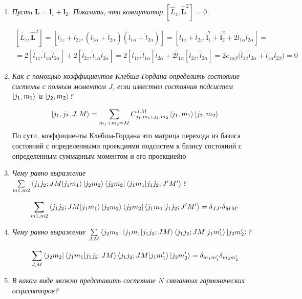 \documentclass{article}
\begin{document}
\begin{enumerate}
	\item \textit{Пусть $\textbf{L} = \textbf{l}_1 + \textbf{l}_2$. Показать, что коммутатор $[\hat{L}_z,\hat{\textbf{L}}^2] = 0$.}
	
	\begin{equation}
	\begin{split}
		[\hat{L}_z,\hat{\textbf{L}}^2] = [\hat{l}_{1z} + \hat{l}_{2z}, (\hat{l}_{1\alpha} + \hat{l}_{2\alpha})(\hat{l}_{1\alpha} + \hat{l}_{2\alpha})] = [\hat{l}_{1z} + \hat{l}_{2z}, \hat{\textbf{l}}_{1}^2 + \hat{\textbf{l}}_{2}^2 + 2\hat{l}_{1\alpha}\hat{l}_{2\alpha}] = \\
		= 2[ \hat{l}_{1z}, \hat{l}_{1\alpha}\hat{l}_{2\alpha}] + 2[ \hat{l}_{2z}, \hat{l}_{1\alpha}\hat{l}_{2\alpha}] = 2[ \hat{l}_{1z}, \hat{l}_{1\alpha}]\hat{l}_{2\alpha} + 2\hat{l}_{1\alpha}[ \hat{l}_{2z}, \hat{l}_{2\alpha}] = 2 e_{z\alpha\beta} \big( \hat{l}_{1\beta} \hat{l}_{2\alpha} + \hat{l}_{1\alpha} \hat{l}_{2\beta}\big ) = 0
	\end{split}
	\end{equation}
	
	\item \textit{Как с помощью коэффициентов Клебша-Гордана определить состояние системы с полным моментом $J$, если известны состояния подсистем $\ket{j_1, m_1}$ и $\ket{j_2, m_2}$?}
	
	\begin{equation}
		\ket{j_1, j_2, J, M} = \sum\limits_{m_1 + m_2 = M} C^{J, M}_{j_1,m_1;,j_2,m_2} \ket{j_1, m_1}\ket{j_2, m_2}
	\end{equation}
	По сути, коэффициенты Клебша-Гордана это матрица перехода из базиса состояний с определенными проекциями подсистем к базису состояний с определенным суммарным моментом и его проекциейю
	
	\item \textit{Чему равно выражение $\sum\limits_{m1,m2}\braket{j_1 j_2; J M|j_1 m_1} \ket{j_2 m_2} \bra{j_2 m_2} \braket{j_1 m_1|j_1 j_2; J' M'}$?}
	
	\begin{equation}
		\sum\limits_{m1,m2}\braket{j_1 j_2; J M|j_1 m_1} \ket{j_2 m_2} \bra{j_2 m_2} \braket{j_1 m_1|j_1 j_2; J' M'} = \delta_{JJ'}\delta_{MM'}
	\end{equation}
	
	\item \textit{Чему равно выражение $\sum\limits_{J,M} \bra{j_2 m_2} \braket{j_1 m_1|j_1 j_2; J M } \braket{j_1 j_2; J M |j_1 m_1'} \ket{j_2 m_2'}$?}
	
	\begin{equation}
		\sum\limits_{J,M} \bra{j_2 m_2} \braket{j_1 m_1|j_1 j_2; J M } \braket{j_1 j_2; J M |j_1 m_1'} \ket{j_2 m_2'} = \delta_{m_1 m_1'} \delta_{m_2 m_2'}
	\end{equation}
	\item \textit{В каком виде можно представить состояние $N$ связанных гармонических осцилляторов?}
	

\end{enumerate}
\end{document}
